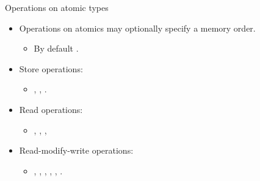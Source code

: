 \begin{frame}[t]{Operations on atomic types}
\begin{itemize}
  \item Operations on atomics may optionally specify a memory order.
    \begin{itemize}
      \item By default .
    \end{itemize}
  \item Store operations:
    \begin{itemize}
      \item {}, , .
    \end{itemize}
  \item Read operations:
    \begin{itemize}
      \item {}, , , 
    \end{itemize}
  \item Read-modify-write operations:
    \begin{itemize}
      \item {}, , , , , .
    \end{itemize}
\end{itemize}
\end{frame}

